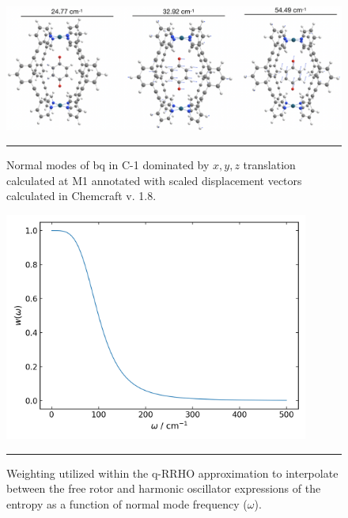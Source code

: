 \documentclass[../../main.tex]{subfiles}
\begin{document}
\begin{figure}[h!]
	\vspace{0.4cm}
	\centering
	\includegraphics[width=\textwidth]{3/da//figs/figS12}
	\vspace{0.2cm}
	\hrule
	\caption{Normal modes of bq in C-1 dominated by $x, y, z$ translation calculated at M1 annotated with scaled displacement vectors calculated in Chemcraft v. 1.8.}
	\label{fig::si_da_12}
\end{figure}

\begin{figure}[h!]
	\vspace{0.4cm}
	\centering
	\includegraphics[width=10cm]{3/da//figs/figS13}
	\vspace{0.2cm}
	\hrule
	\caption{Weighting utilized within the q-RRHO approximation to interpolate between the free rotor and harmonic oscillator expressions of the entropy as a function of normal mode frequency ($\omega$).}
	\label{fig::si_da_13}
\end{figure}
\end{document}
